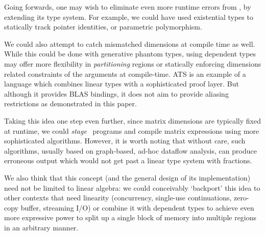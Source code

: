 Going forwards, one may wish to eliminate even more runtime errors from \lang,
by extending its type system. For example, we could have used existential types
to statically track pointer identities\cite{morrisett}, or parametric
polymorphism.

We could also attempt to catch mismatched dimensions at compile time
as well.  While this could be done with generative phantom
types\cite{abe2015simple}, using dependent types may offer more
flexibility in \emph{partitioning} regions\cite{space_monads} or
statically enforcing dimensions related constraints of the arguments
at compile-time.  ATS\cite{cui2005ats} is an example of a language
which combines linear types with a sophisticated proof layer. But
although it provides BLAS bindings, it does not aim to provide
aliasing restrictions as demonstrated in this paper.

Taking this idea one step even further, since matrix dimensions are typically
fixed at runtime, we could \emph{stage} \lang\ programs and compile matrix
expressions using more sophisticated algorithms\cite{barthels}. However, it is
worth noting that without care, such algorithms\cite{rocklin_thesis}, usually
based on graph-based, ad-hoc dataflow analysis, can produce erroneous output
which would not get past a linear type system with fractions.

We also think that this concept (and the general design of its implementation)
need not be limited to linear algebra: we could conceivably `backport' this
idea to other contexts that need linearity (concurrency, single-use
continuations, zero-copy buffer, streaming I/O) or combine it with dependent
types to achieve even more expressive power to split up a single block of
memory into multiple regions in an arbitrary manner\cite{space_monads}.
